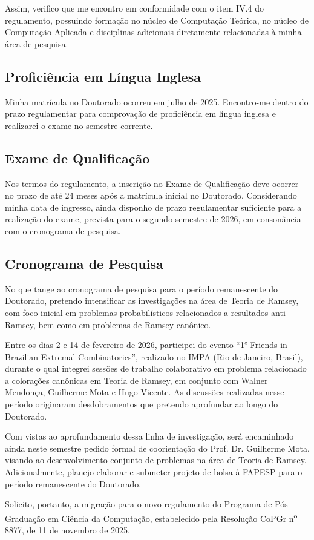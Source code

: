 \documentclass[reqno, 12pt]{amsart}
\begin{document}
Assim, verifico que me encontro em conformidade com o item IV.4 do regulamento, possuindo formação no núcleo de Computação Teórica, no núcleo de Computação Aplicada e disciplinas adicionais diretamente relacionadas à minha área de pesquisa.

\subsection{Proficiência em Língua Inglesa}

Minha matrícula no Doutorado ocorreu em julho de 2025. Encontro-me dentro do prazo regulamentar para comprovação de proficiência em língua inglesa e realizarei o exame no semestre corrente.

\subsection{Exame de Qualificação}

Nos termos do regulamento, a inscrição no Exame de Qualificação deve ocorrer no prazo de até 24 meses após a matrícula inicial no Doutorado. Considerando minha data de ingresso, ainda disponho de prazo regulamentar suficiente para a realização do exame, prevista para o segundo semestre de 2026, em consonância com o cronograma de pesquisa.
\subsection{Cronograma de Pesquisa}

No que tange ao cronograma de pesquisa para o período remanescente do Doutorado, pretendo intensificar as investigações na área de Teoria de Ramsey, com foco inicial em problemas probabilísticos relacionados a resultados anti-Ramsey, bem como em problemas de Ramsey canônico.
 
Entre os dias 2 e 14 de fevereiro de 2026, participei do evento ``1° Friends in Brazilian Extremal Combinatorics'', realizado no IMPA (Rio de Janeiro, Brasil), durante o qual integrei sessões de trabalho colaborativo em problema relacionado a colorações canônicas em Teoria de Ramsey, em conjunto com Walner Mendonça, Guilherme Mota e Hugo Vicente. As discussões realizadas nesse período originaram desdobramentos que pretendo aprofundar ao longo do Doutorado.

Com vistas ao aprofundamento dessa linha de investigação, será encaminhado ainda neste semestre pedido formal de coorientação do Prof. Dr. Guilherme Mota, visando ao desenvolvimento conjunto de problemas na área de Teoria de Ramsey. Adicionalmente, planejo elaborar e submeter projeto de bolsa à FAPESP para o período remanescente do Doutorado.

Solicito, portanto, a migração para o novo regulamento do Programa de Pós-Graduação em Ciência da Computação, estabelecido pela Resolução CoPGr n\textsuperscript{o} 8877, de 11 de novembro de 2025.
\end{document}
